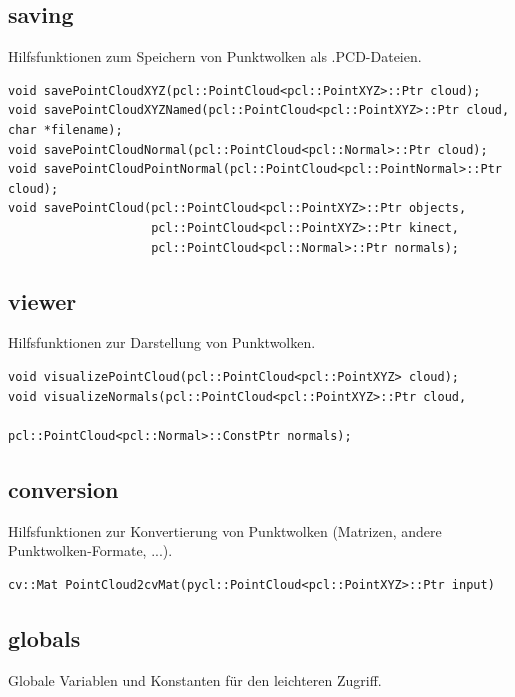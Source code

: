 \documentclass{suturo}
\begin{document}
\subsection{saving}
Hilfsfunktionen zum Speichern von Punktwolken als .PCD-Dateien.

\begin{verbatim}
void savePointCloudXYZ(pcl::PointCloud<pcl::PointXYZ>::Ptr cloud);
void savePointCloudXYZNamed(pcl::PointCloud<pcl::PointXYZ>::Ptr cloud, char *filename);
void savePointCloudNormal(pcl::PointCloud<pcl::Normal>::Ptr cloud);
void savePointCloudPointNormal(pcl::PointCloud<pcl::PointNormal>::Ptr cloud);
void savePointCloud(pcl::PointCloud<pcl::PointXYZ>::Ptr objects,
                    pcl::PointCloud<pcl::PointXYZ>::Ptr kinect,
                    pcl::PointCloud<pcl::Normal>::Ptr normals);
\end{verbatim}

\subsection{viewer}
Hilfsfunktionen zur Darstellung von Punktwolken.

\begin{verbatim}
void visualizePointCloud(pcl::PointCloud<pcl::PointXYZ> cloud);
void visualizeNormals(pcl::PointCloud<pcl::PointXYZ>::Ptr cloud, 			 	
									pcl::PointCloud<pcl::Normal>::ConstPtr normals);
\end{verbatim}

\subsection{conversion}
Hilfsfunktionen zur Konvertierung von Punktwolken (Matrizen, andere Punktwolken-Formate, ...).

\begin{verbatim}
cv::Mat PointCloud2cvMat(pycl::PointCloud<pcl::PointXYZ>::Ptr input)
\end{verbatim}
\subsection{globals}
Globale Variablen und Konstanten für den leichteren Zugriff.
\end{document}
